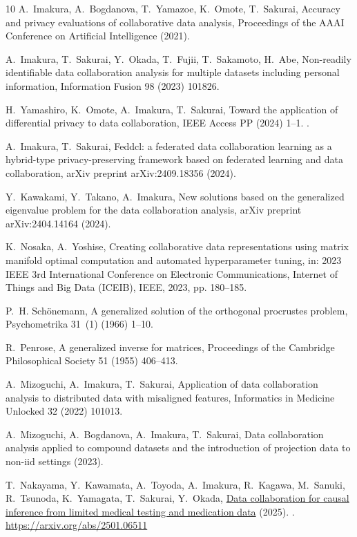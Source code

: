 \documentclass[final,3p,times]{elsarticle}
\theoremstyle{plain}
\begin{document}
\begin{thebibliography}{10}
A.~Imakura, A.~Bogdanova, T.~Yamazoe, K.~Omote, T.~Sakurai, Accuracy and privacy evaluations of collaborative data analysis, Proceedings of the AAAI Conference on Artificial Intelligence (2021).

A.~Imakura, T.~Sakurai, Y.~Okada, T.~Fujii, T.~Sakamoto, H.~Abe, Non-readily identifiable data collaboration analysis for multiple datasets including personal information, Information Fusion 98 (2023) 101826.

H.~Yamashiro, K.~Omote, A.~Imakura, T.~Sakurai, Toward the application of differential privacy to data collaboration, IEEE Access PP (2024) 1--1.
\newblock \href {https://doi.org/10.1109/ACCESS.2024.3396146} {}.

A.~Imakura, T.~Sakurai, Feddcl: a federated data collaboration learning as a hybrid-type privacy-preserving framework based on federated learning and data collaboration, arXiv preprint arXiv:2409.18356 (2024).

Y.~Kawakami, Y.~Takano, A.~Imakura, New solutions based on the generalized eigenvalue problem for the data collaboration analysis, arXiv preprint arXiv:2404.14164 (2024).

K.~Nosaka, A.~Yoshise, Creating collaborative data representations using matrix manifold optimal computation and automated hyperparameter tuning, in: 2023 IEEE 3rd International Conference on Electronic Communications, Internet of Things and Big Data (ICEIB), IEEE, 2023, pp. 180--185.

P.~H. Sch{\"o}nemann, A generalized solution of the orthogonal procrustes problem, Psychometrika 31~(1) (1966) 1--10.

R.~Penrose, A generalized inverse for matrices, Proceedings of the Cambridge Philosophical Society 51 (1955) 406--413.

A.~Mizoguchi, A.~Imakura, T.~Sakurai, Application of data collaboration analysis to distributed data with misaligned features, Informatics in Medicine Unlocked 32 (2022) 101013.

A.~Mizoguchi, A.~Bogdanova, A.~Imakura, T.~Sakurai, Data collaboration analysis applied to compound datasets and the introduction of projection data to non-iid settings (2023).

T.~Nakayama, Y.~Kawamata, A.~Toyoda, A.~Imakura, R.~Kagawa, M.~Sanuki, R.~Tsunoda, K.~Yamagata, T.~Sakurai, Y.~Okada, \href{https://arxiv.org/abs/2501.06511}{Data collaboration for causal inference from limited medical testing and medication data} (2025).
\newblock \href {http://arxiv.org/abs/2501.06511} {}.
\newline\urlprefix\url{https://arxiv.org/abs/2501.06511}


\end{thebibliography}
\end{document}
